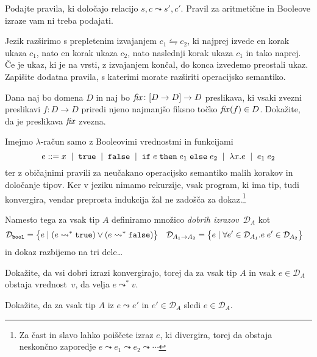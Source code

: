 \documentclass[arhiv]{../izpit}
\begin{document}
\podnaloga Podajte pravila, ki določajo relacijo $s, c \leadsto s', c'$. Pravil za aritmetične in Booleove izraze vam ni treba podajati.

\newcommand{\interleave}[2]{#1 \leftrightharpoons #2}
\podnaloga Jezik {\imp} razširimo s prepletenim izvajanjem $\interleave{c_1}{c_2}$, ki najprej izvede en korak ukaza $c_1$, nato en korak ukaza $c_2$, nato naslednji korak ukaza $c_1$ in tako naprej. Če je ukaz, ki je na vrsti, z izvajanjem končal, do konca izvedemo preostali ukaz. Zapišite dodatna pravila, s katerimi morate razširiti operacijsko semantiko.
\prostor[2]

\nadaljevanje

\naloga[\tocke{20}]
Dana naj bo domena $D$ in naj bo $\mathit{fix} \colon [D \to D] \to D$ preslikava, ki vsaki zvezni preslikavi $f \colon D \to D$ priredi njeno najmanjšo fiksno točko $\mathit{fix}(f) \in D$. Dokažite, da je preslikava $\mathit{fix}$ zvezna.

\nadaljevanje

\naloga[\tocke{20}]
\newcommand{\good}[1]{\mathcal{D}_{#1}}
Imejmo $\lambda$-račun samo z Booleovimi vrednostmi in funkcijami
\[
  e \mathrel{{:}{:}{=}}
  x \;\mid\;
  \mathtt{true} \;\mid\;
  \mathtt{false} \;\mid\;
  \mathtt{if}\;e\;\mathtt{then}\;e_1\;\mathtt{else}\;e_2 \;\mid\;
  \lambda x. e \;\mid\;
  e_1 \; e_2
\]
ter z običajnimi pravili za neučakano operacijsko semantiko malih korakov in določanje tipov. Ker v jeziku nimamo rekurzije, vsak program, ki ima tip, tudi konvergira, vendar preprosta indukcija žal ne zadošča za dokaz.\footnote{Za čast in slavo lahko poiščete izraz $e$, ki divergira, torej da obstaja neskončno zaporedje
$e \leadsto e_1 \leadsto e_2 \leadsto \cdots$
}


Namesto tega za vsak tip $A$ definiramo množico \emph{dobrih izrazov}~$\good{A}$ kot
%
\begin{align*}
  \good{\boolty} &=
    \big\{ e \mid (e \leadsto^* \tru) \lor (e \leadsto^* \fls) \big\} &
  \good{\funty{A_1}{A_2}} &=
    \big\{ e \mid \forall e' \in \good{A_1}. e \; e' \in \good{A_2} \big\}
\end{align*}
%
in dokaz razbijemo na tri dele\ldots

\podnaloga
Dokažite, da vsi dobri izrazi konvergirajo, torej da za vsak tip $A$ in vsak $e \in \good{A}$ obstaja vrednost~$v$, da velja $e \leadsto^* v$.

\podnaloga
Dokažite, da za vsak tip $A$ iz $e \leadsto e'$ in $e' \in \good{A}$ sledi $e \in \good{A}$.
\end{document}
